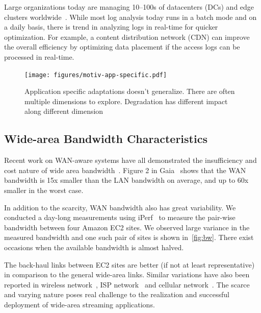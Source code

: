  Large organizations today are managing 10--100s of
datacenters (DCs) and edge clusters worldwide~\cite{calder2013mapping}. While
most log analysis today runs in a batch mode and on a daily basis, there is
trend in analyzing logs in real-time for quicker optimization. For example, a
content distribution network (CDN) can improve the overall efficiency by
optimizing data placement if the access logs can be processed in real-time.


\begin{figure}
  \centering
  \texttt{[image: figures/motiv-app-specific.pdf]}
  \caption{Application specific adaptations doesn't generalize. There are often
    multiple dimensions to explore. Degradation has different impact along
    different dimension}
  \label{fig:app-specific}
\end{figure}

\subsection{Wide-area Bandwidth Characteristics}
\label{sec:wide-area-bandwidth}

Recent work on WAN-aware systems have all demonstrated the insufficiency and
cost nature of wide area bandwidth~\cite{pu2015low, vulimiri2015global}. Figure
2 in Gaia~\cite{hsieh17gaia} shows that the WAN bandwidth is 15x smaller than
the LAN bandwidth on average, and up to 60x smaller in the worst case.

In addition to the scarcity, WAN bandwidth also has great variability. We
conducted a day-long measurements using iPerf~\cite{iperf3} to measure the
pair-wise bandwidth between four Amazon EC2 sites. We observed large variance in
the measured bandwidth and one such pair of sites is shown
in~\autoref{fig:bw}. There exist occasions when the available bandwidth is
almost halved.

The back-haul links between EC2 sites are better (if not at least
representative) in comparison to the general wide-area links. Similar variations
have also been reported in wireless network~\cite{biswas2015large}, ISP
network~\cite{grover2013peeking} and cellular
network~\cite{nikravesh2014mobile}. The scarce and varying nature poses real
challenge to the realization and successful deployment of wide-area streaming
applications.

